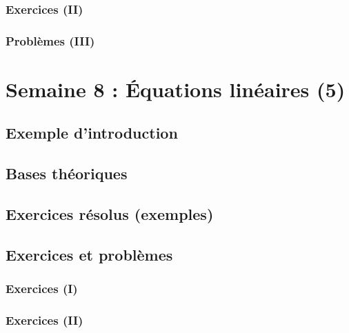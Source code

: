 \documentclass[
  12pt,
]{book}
\begin{document}
\hypertarget{exercices-ii-6}{%
\subsection{Exercices (II)}\label{exercices-ii-6}}

\hypertarget{probluxe8mes-iii-6}{%
\subsection{Problèmes (III)}\label{probluxe8mes-iii-6}}

\hypertarget{semaine-8-uxe9quations-linuxe9aires-5}{%
\chapter{Semaine 8 : Équations linéaires (5)}\label{semaine-8-uxe9quations-linuxe9aires-5}}

\hypertarget{exemple-dintroduction-7}{%
\section{Exemple d'introduction}\label{exemple-dintroduction-7}}

\hypertarget{bases-thuxe9oriques-7}{%
\section{Bases théoriques}\label{bases-thuxe9oriques-7}}

\hypertarget{exercices-ruxe9solus-exemples-7}{%
\section{Exercices résolus (exemples)}\label{exercices-ruxe9solus-exemples-7}}

\hypertarget{exercices-et-probluxe8mes-7}{%
\section{Exercices et problèmes}\label{exercices-et-probluxe8mes-7}}

\hypertarget{exercices-i-7}{%
\subsection{Exercices (I)}\label{exercices-i-7}}

\hypertarget{exercices-ii-7}{%
\subsection{Exercices (II)}\label{exercices-ii-7}}
\end{document}

